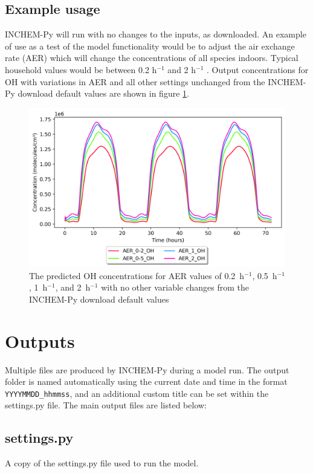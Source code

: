 \documentclass[a4paper]{refart}
\begin{document}
\subsection{Example usage}
INCHEM-Py will run with no changes to the inputs, as downloaded. An example of use as a test of the model functionality would be to adjust the air exchange rate (AER) which will change the concentrations of all species indoors. Typical household values would be between 0.2 h$^{-1}$ and 2 h$^{-1}$ \cite{Weschler2000}.  Output concentrations for OH with variations in AER and all other settings unchanged from the INCHEM-Py download default values are shown in figure \ref{fig:OH_AER}.
\begin{figure}[h]
    \centering
    \includegraphics[width=\textwidth]{OH_AER.png}
    \caption{The predicted OH concentrations for AER values of 0.2~h$^{-1}$, 0.5~h$^{-1}$, 1~h$^{-1}$, and 2~h$^{-1}$ with no other variable changes from the INCHEM-Py download default values}
    \label{fig:OH_AER}
\end{figure}



\newpage
\section{Outputs}\label{outputs}
Multiple files are produced by INCHEM-Py during a model run. The output folder is named automatically using the current date and time in the format \texttt{YYYYMMDD\_hhmmss}, and an additional custom title can be set within the settings.py file. The main output files are listed below: 

\subsection{settings.py}
A copy of the settings.py file used to run the model.
\end{document}
